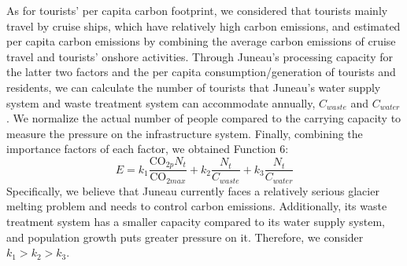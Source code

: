 \documentclass[12pt]{article}  %
\begin{document}
As for tourists' per capita carbon footprint, we considered that tourists mainly travel by cruise ships, which have relatively high carbon emissions, and estimated per capita carbon emissions by combining the average carbon emissions of cruise travel and tourists' onshore activities.
Through Juneau's processing capacity for the latter two factors and the per capita consumption/generation of tourists and residents, we can calculate the number of tourists that Juneau's water supply system and waste treatment system can accommodate annually, $C_{waste}$ and $C_{water}$. We normalize the actual number of people compared to the carrying capacity to measure the pressure on the infrastructure system. Finally, combining the importance factors of each factor, we obtained Function 6:
\begin{equation}
	E=k_{1}\frac{\text{CO}_{2p}N_{t}}{\text{CO}_{2max}}+k_{2}\frac{N_{t}}{C_{waste}}+k_{3}\frac{N_{t}}{C_{water}}
\end{equation}
Specifically, we believe that Juneau currently faces a relatively serious glacier melting problem and needs to control carbon emissions. Additionally, its waste treatment system has a smaller capacity compared to its water supply system, and population growth puts greater pressure on it. Therefore, we consider $k_1>k_2>k_3$.
\end{document}
